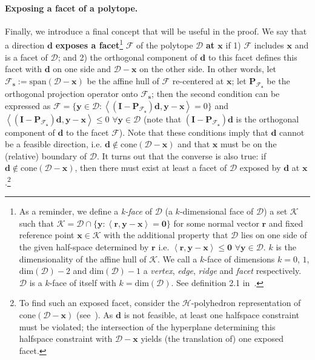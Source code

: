 \documentclass{article} %
\newcommand{\domain}{\mathcal{D}}
\newcommand{\x}{\bm{x}}
\newcommand{\y}{\bm{y}}
\newcommand{\s}{\bm{s}}
\newcommand{\dd}{\bm{d}}
\renewcommand{\r}{\bm{r}}
\newcommand{\innerProd}[2]{\left\langle #1 , #2 \right\rangle}
\newcommand{\proj}{\bm{P}}
\newcommand{\Kface}{\mathcal{K}}
\newcommand{\id}{\mathbf{I}} %
\newcommand{\0}{\mathbf{0}} %
\begin{document}
\paragraph{Exposing a facet of a polytope.} Finally, we introduce a final concept that will be useful in the proof. We say that a direction $\dd$ \textbf{exposes a facet}\footnote{As a reminder, we define a \emph{k-face} of $\domain$ (a $k$-dimensional face of $\domain$) a set $\Kface$ such that $\Kface = \domain \cap \{ \y : \innerProd{\r}{\y - \x} = \0 \}$ for some normal vector $\r$ and fixed reference point $\x \in \Kface$ with the additional property that $\domain$ lies on one side of the given half-space determined by $\r$ i.e. $ \innerProd{\r}{\y - \x} \leq \0$ $\forall \y \in \domain$. $k$ is the dimensionality of the affine hull of $\Kface$. We call a $k$-face of dimensions $k = 0$, $1$, $\textrm{dim}(\domain)-2$ and $\textrm{dim}(\domain)-1$ a \emph{vertex}, \emph{edge}, \emph{ridge} and \emph{facet} respectively. $\domain$ is a $k$-face of itself with $k = \textrm{dim}(\domain)$. See definition 2.1 in~\cite{Ziegler:1995td}.}  $\mathcal{F}$ of the polytope $\domain$ \textbf{at $\x$} if 1) $\mathcal{F}$ includes $\x$ and is a facet of $\domain$; and 2) the orthogonal component of $\dd$ to this facet defines this facet with $\dd$ on one side and $\domain - \x$ on the other side. In other words, let $\mathcal{F}_{\s} := \textrm{span}(\domain - \x)$ be the affine hull of $\mathcal{F}$ re-centered at $\x$; let $\proj_{\mathcal{F}_{\s}}$ be the orthogonal projection operator onto $\mathcal{F}_{\s}$; then the second condition can be expressed as $\mathcal{F} = \{\y \in \domain : \innerProd{(\id - \proj_{\mathcal{F}_{\s}})\dd}{\y-\x} = 0 \}$ and $\innerProd{(\id - \proj_{\mathcal{F}_{\s}})\dd}{\y-\x} \leq 0$ $\forall \y \in \domain$ (note that $(\id - \proj_{\mathcal{F}_{\s}})\dd$ is the orthogonal component of $\dd$ to the facet $\mathcal{F}$). Note that these conditions imply that $\dd$ cannot be a feasible direction, i.e. $\dd \notin \textrm{cone}(\domain-\x)$ and that $\x$ must be on the (relative) boundary of $\domain$. It turns out that the converse is also true: if $\dd \notin \textrm{cone}(\domain-\x)$, then there must exist at least a facet of $\domain$ exposed by $\dd$ at $\x$.\footnote{To find such an exposed facet, consider the $\mathcal{H}$-polyhedron representation of $\textrm{cone}(\domain-\x)$ (see~\cite{Ziegler:1995td}). As $\dd$ is not feasible, at least one halfspace constraint must be violated; the intersection of the hyperplane determining this halfspace constraint with $\domain-\x$ yields (the translation of) one exposed facet.}
\end{document}
